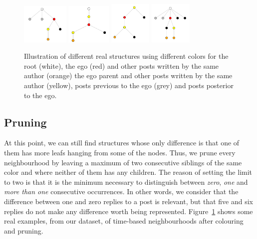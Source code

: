 \documentclass[conference]{IEEEtran}
\begin{document}
\begin{figure}
\centering
\includegraphics[width=0.2\textwidth]{neighbourhood_time_342}
\includegraphics[width=0.19\textwidth]{neighbourhood_time_456}
\includegraphics[width=0.18\textwidth]{neighbourhood_time_501}
\includegraphics[width=0.18\textwidth]{neighbourhood_time_524}
\caption{Illustration of different real structures using different colors for the root (white), the ego (red) and other posts written by the same author (orange) the ego parent and other posts written by the same author (yellow), posts previous to the ego (grey) and posts posterior to the ego.}
\label{fig:colors}
\end{figure}

\subsection{Pruning}
At this point, we can still find structures whose only difference is that one of them has more leafs hanging from some of the nodes. Thus, we prune every neighbourhood by leaving a maximum of two consecutive siblings of the same color and where neither of them has any children. The reason of setting the limit to two is that it is the minimum necessary to distinguish between \textit{zero}, \textit{one} and \textit{more than one} consecutive occurrences. In other words, we consider that the difference between one and zero replies to a post is relevant, but that five and six replies do not make any difference worth being represented.    
Figure~\ref{fig:colors} shows some real examples, from our dataset, of time-based neighbourhoods after colouring and pruning.
\end{document}
